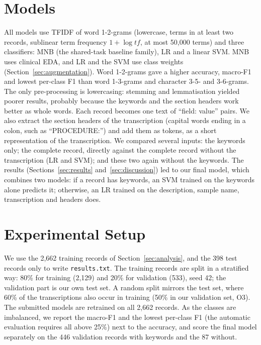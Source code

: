\documentclass[twocolumn,10pt]{article}
\begin{document}
\section{Models}
\label{sec:models}

All models use \ac{TFIDF} of word 1-2-grams (lowercase, terms in at least two records, sublinear term frequency $1+\log\mathit{tf}$, at most 50,000 terms) and three classifiers: \ac{MNB} (the shared-task baseline family), \ac{LR} and a linear \ac{SVM}. \ac{MNB} uses clinical \acs{EDA}, and \ac{LR} and the \ac{SVM} use class weights (Section~\ref{sec:augmentation}). Word 1-2-grams gave a higher accuracy, macro-F1 and lowest per-class F1 than word 1-3-grams and character 3-5- and 3-6-grams. The only pre-processing is lowercasing: stemming and lemmatisation yielded poorer results, probably because the keywords and the section headers work better as whole words. Each record becomes one text of ``field: value'' pairs. We also extract the section headers of the transcription (capital words ending in a colon, such as ``PROCEDURE:'') and add them as tokens, as a short representation of the transcription. We compared several inputs: the keywords only; the complete record, directly against the complete record without the transcription (\acs{LR} and \acs{SVM}); and these two again without the keywords. The results (Sections~\ref{sec:results} and~\ref{sec:discussion}) led to our final model, which combines two models: if a record has keywords, an \ac{SVM} trained on the keywords alone predicts it; otherwise, an \ac{LR} trained on the description, sample name, transcription and headers does.

\section{Experimental Setup}
\label{sec:setup}

We use the 2,662 training records of Section~\ref{sec:analysis}, and the 398 test records only to write \texttt{results.txt}. The training records are split in a stratified way: 80\% for training (2,129) and 20\% for validation (533), seed 42; the validation part is our own test set. A random split mirrors the test set, where 60\% of the transcriptions also occur in training (50\% in our validation set, O3). The submitted models are retrained on all 2,662 records. As the classes are imbalanced, we report the macro-F1 and the lowest per-class F1 (the automatic evaluation requires all above 25\%) next to the accuracy, and score the final model separately on the 446 validation records with keywords and the 87 without.
\end{document}
